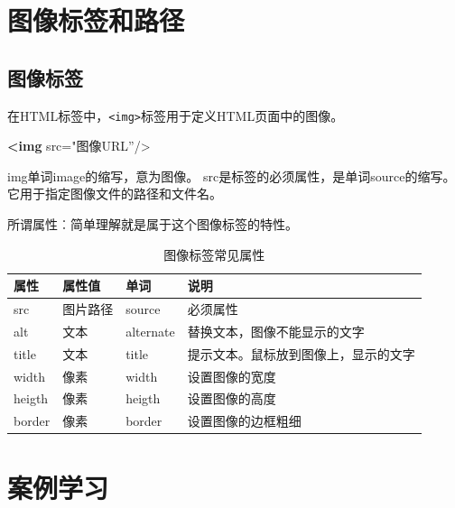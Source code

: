 \documentclass[
]{book}
\newenvironment{Shaded}{\begin{snugshade}}{\end{snugshade}}
\newcommand{\KeywordTok}[1]{\textcolor[rgb]{0.13,0.29,0.53}{\textbf{#1}}}
\newcommand{\OtherTok}[1]{\textcolor[rgb]{0.56,0.35,0.01}{#1}}
\newcommand{\StringTok}[1]{\textcolor[rgb]{0.31,0.60,0.02}{#1}}
\begin{document}
\hypertarget{ux56feux50cfux6807ux7b7eux548cux8defux5f84}{%
\section{图像标签和路径}\label{ux56feux50cfux6807ux7b7eux548cux8defux5f84}}

\hypertarget{ux56feux50cfux6807ux7b7e}{%
\subsection{图像标签}\label{ux56feux50cfux6807ux7b7e}}

在HTML标签中，\texttt{\textless{}img\textgreater{}}标签用于定义HTML页面中的图像。

\begin{Shaded}
\begin{Highlighting}[]
\KeywordTok{\textless{}img}\OtherTok{ src=}\StringTok{"图像URL”/\textgreater{}}
\end{Highlighting}
\end{Shaded}

img单词image的缩写，意为图像。
src是标签的必须属性，是单词source的缩写。它用于指定图像文件的路径和文件名。

所谓属性︰简单理解就是属于这个图像标签的特性。

\begin{table}

\caption{\label{tab:unnamed-chunk-9}图像标签常见属性}
\centering
\begin{tabular}[t]{llll}
\toprule
属性 & 属性值 & 单词 & 说明\\
\midrule
src & 图片路径 & source & 必须属性\\
alt & 文本 & alternate & 替换文本，图像不能显示的文字\\
title & 文本 & title & 提示文本。鼠标放到图像上，显示的文字\\
width & 像素 & width & 设置图像的宽度\\
heigth & 像素 & heigth & 设置图像的高度\\
\addlinespace
border & 像素 & border & 设置图像的边框粗细\\
\bottomrule
\end{tabular}
\end{table}

\hypertarget{ux6848ux4f8bux5b66ux4e60}{%
\section{案例学习}\label{ux6848ux4f8bux5b66ux4e60}}
\end{document}
